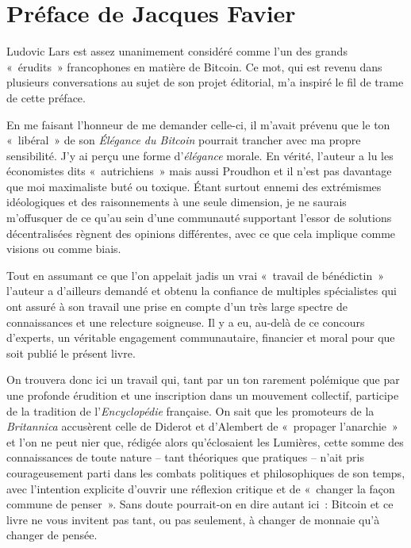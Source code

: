 
\chapter*{Préface de Jacques Favier}

Ludovic Lars est assez unanimement considéré comme l'un des grands «~érudits~» francophones en matière de Bitcoin. Ce mot, qui est revenu dans plusieurs conversations au sujet de son projet éditorial, m'a inspiré le fil de trame de cette préface.

En me faisant l'honneur de me demander celle-ci, il m'avait prévenu que le ton «~libéral~» de son \emph{Élégance du Bitcoin} pourrait trancher avec ma propre sensibilité. J'y ai perçu une forme d'\emph{élégance} morale. En vérité, l'auteur a lu les économistes dits «~autrichiens~» mais aussi Proudhon et il n'est pas davantage que moi maximaliste buté ou toxique. Étant surtout ennemi des extrémismes idéologiques et des raisonnements à une seule dimension, je ne saurais m'offusquer de ce qu'au sein d'une communauté supportant l'essor de solutions décentralisées règnent des opinions différentes, avec ce que cela implique comme visions ou comme biais.

Tout en assumant ce que l'on appelait jadis un vrai «~travail de bénédictin~» l'auteur a d'ailleurs demandé et obtenu la confiance de multiples spécialistes qui ont assuré à son travail une prise en compte d'un très large spectre de connaissances et une relecture soigneuse. Il y a eu, au-delà de ce concours d'experts, un véritable engagement communautaire, financier et moral pour que soit publié le présent livre.

On trouvera donc ici un travail qui, tant par un ton rarement polémique que par une profonde érudition et une inscription dans un mouvement collectif, participe de la tradition de l'\emph{Encyclopédie} française. On sait que les promoteurs de la \emph{Britannica} accusèrent celle de Diderot et d'Alembert de «~propager l'anarchie~» et l'on ne peut nier que, rédigée alors qu'éclosaient les Lumières, cette somme des connaissances de toute nature – tant théoriques que pratiques – n'ait pris courageusement parti dans les combats politiques et philosophiques de son temps, avec l'intention explicite d'ouvrir une réflexion critique et de «~changer la façon commune de penser~». Sans doute pourrait-on en dire autant ici~: Bitcoin et ce livre ne vous invitent pas tant, ou pas seulement, à changer de monnaie qu'à changer de pensée.

